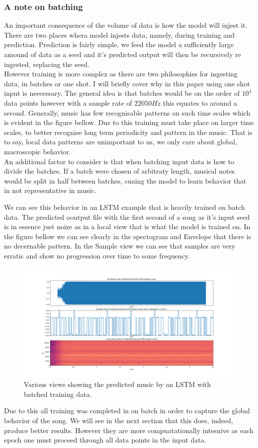 \documentclass{article}
\begin{document}
\subsubsection{A note on batching}
An important consequence of the volume of data is how the model will injest it. 
There are two places whera model injests data, namely, during training and prediction. Prediction is fairly simple, we feed the model a sufficiently large amound of data as a seed and it's predicted output will then be recursively re ingested, replacing the seed.\\
However training is more complex as there are two philosophies for ingesting data, in batches or one shot. I will briefly cover why in this paper using one shot input is neecessary. The general idea is that batches would be on the order of $10^4$ data points however with a sample rate of $22050 Hz$ this equates to around a second. Generally, music has few recognisable patterns on such time scales which is evident in the figure bellow. Due to this training must take place on larger time scales, to better recognise long term periodicity and pattern in the music. That is to say, local data patterns are unimportant to us, we only care about global, macroscopic behavior.\\
An additional factor to consider is that when batching input data is how to divide the batches. If a batch were chosen of arbitraty length, musical notes would be split in half between batches, cuaing the model to learn behavior that in not representative in music. 


We can see this behavior in an LSTM example that is heavily trained on batch data. The predicted ooutput file with the first second of a song as it's input seed is in essence just noize as in a local view that is what the model is trained on. In the figure bellow we can see clearly in the spectogram and Envelope that there is no decernable pattern. In the Sample view we can see that samples are very erratic and show no progression over time to some frequency. 
\begin{figure}[H]
\caption{Various views showing the predicted music by an LSTM with batched training data. }
\includegraphics[scale=0.35]{batch_training.png}
\end{figure}
Due to this all training was completed in on batch in order to capture the global behavior of the song. We will see in the next section that this does, indeed, produce better results. However they are more compuatationally intesnive as each epoch one must proceed through all data points in the input data. 
\end{document}
